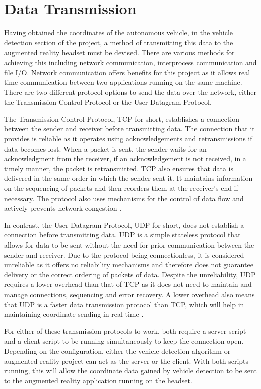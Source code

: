 \documentclass{l4proj}
\begin{document}
\section{Data Transmission}

Having obtained the coordinates of the autonomous vehicle, in the vehicle detection section of the project, a method of transmitting this data to the augmented reality headset must be devised. There are various methods for achieving this including network communication, interprocess communication and file I/O. Network communication offers benefits for this project as it allows real time communication between two applications running on the same machine. There are two different protocol options to send the data over the network, either the Transmission Control Protocol or the User Datagram Protocol.

The Transmission Control Protocol, TCP for short, establishes a connection between the sender and receiver before transmitting data. The connection that it provides is reliable as it operates using acknowledgements and retransmissions if data becomes lost. When a packet is sent, the sender waits for an acknowledgment from the receiver, if an acknowledgement is not received, in a timely manner, the packet is retransmitted. TCP also ensures that data is delivered in the same order in which the sender sent it. It maintains information on the sequencing of packets and then reorders them at the receiver's end if necessary. The protocol also uses mechanisms for the control of data flow and actively prevents network congestion \citep{tcp_udp}.

In contrast, the User Datagram Protocol, UDP for short, does not establish a connection before transmitting data. UDP is a simple stateless protocol that allows for data to be sent without the need for prior communication between the sender and receiver. Due to the protocol being connectionless, it is considered unreliable as it offers no reliability mechanisms and therefore does not guarantee delivery or the correct ordering of packets of data. Despite the unreliability, UDP requires a lower overhead than that of TCP as it does not need to maintain and manage connections, sequencing and error recovery. A lower overhead also means that UDP is a faster data transmission protocol than TCP, which will help in maintaining coordinate sending in real time \citep{tcp_udp}.

For either of these transmission protocols to work, both require a server script and a client script to be running simultaneously to keep the connection open. Depending on the configuration, either the vehicle detection algorithm or augmented reality project can act as the server or the client. With both scripts running, this will allow the coordinate data gained by vehicle detection to be sent to the augmented reality application running on the headset.
\end{document}
